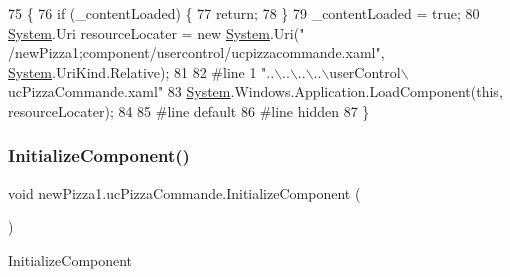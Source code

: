 \begin{DoxyCode}
75                                           \{
76             \textcolor{keywordflow}{if} (\_contentLoaded) \{
77                 \textcolor{keywordflow}{return};
78             \}
79             \_contentLoaded = \textcolor{keyword}{true};
80             \hyperlink{namespaceSystem}{System}.Uri resourceLocater = \textcolor{keyword}{new} \hyperlink{namespaceSystem}{System}.Uri(\textcolor{stringliteral}{"
      /newPizza1;component/usercontrol/ucpizzacommande.xaml"}, \hyperlink{namespaceSystem}{System}.UriKind.Relative);
81             
82 \textcolor{preprocessor}{            #line 1 "..\(\backslash\)..\(\backslash\)..\(\backslash\)..\(\backslash\)userControl\(\backslash\)ucPizzaCommande.xaml"
}
83             \hyperlink{namespaceSystem}{System}.Windows.Application.LoadComponent(\textcolor{keyword}{this}, resourceLocater);
84             
85 \textcolor{preprocessor}{            #line default
}
86 \textcolor{preprocessor}{            #line hidden
}
87         \}
\end{DoxyCode}
\mbox{\label{classnewPizza1_1_1ucPizzaCommande_a64b08961b7d2239fe9cf481dad628572}} 
\subsubsection{\texorpdfstring{Initialize\+Component()}{InitializeComponent()}\hspace{0.1cm}{\footnotesize\ttfamily [3/4]}}
{\footnotesize\ttfamily void new\+Pizza1.\+uc\+Pizza\+Commande.\+Initialize\+Component (\begin{DoxyParamCaption}{ }\end{DoxyParamCaption})\hspace{0.3cm}{\ttfamily [inline]}}



Initialize\+Component 


